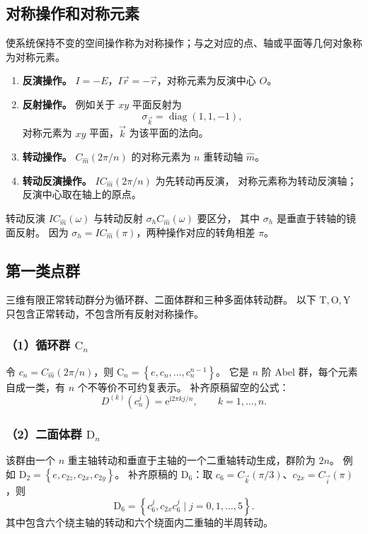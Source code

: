 \subsection{对称操作和对称元素}
使系统保持不变的空间操作称为对称操作；与之对应的点、轴或平面等几何对象称为对称元素。
\begin{enumerate}
\item \textbf{反演操作。} $I=-E$，$I\vec r=-\vec r$，对称元素为反演中心 $O$。
\item \textbf{反射操作。} 例如关于 $xy$ 平面反射为
\begin{equation}
\sigma_{\vec k}=\operatorname{diag}\left(1,1,-1\right),
\end{equation}
对称元素为 $xy$ 平面，$\vec k$ 为该平面的法向。
\item \textbf{转动操作。} $C_{\hat m}\left(2\pi/n\right)$ 的对称元素为 $n$ 重转动轴 $\hat m$。
\item \textbf{转动反演操作。} $IC_{\hat m}\left(2\pi/n\right)$ 为先转动再反演，
对称元素称为转动反演轴；反演中心取在轴上的原点。
\end{enumerate}
转动反演 $IC_{\hat m}\left(\omega\right)$ 与转动反射 $\sigma_hC_{\hat m}\left(\omega\right)$ 要区分，
其中 $\sigma_h$ 是垂直于转轴的镜面反射。
因为 $\sigma_h=IC_{\hat m}\left(\pi\right)$，两种操作对应的转角相差 $\pi$。

\subsection{第一类点群}
三维有限正常转动群分为循环群、二面体群和三种多面体转动群。
以下 $\mathrm{T},\mathrm{O},\mathrm{Y}$ 只包含正常转动，不包含所有反射对称操作。

\subsubsection*{（1）循环群 $\mathrm{C}_n$}
令 $c_n=C_{\hat m}\left(2\pi/n\right)$，则 $\mathrm{C}_n=\left\{e,c_n,\ldots,c_n^{n-1}\right\}$。
它是 $n$ 阶 Abel 群，每个元素自成一类，有 $n$ 个不等价不可约复表示。
补齐原稿留空的公式：
\begin{equation}
D^{\left(k\right)}\left(c_n^j\right)=\mathrm{e}^{\mathrm{i}2\pi kj/n},\qquad k=1,\ldots,n.
\end{equation}

\subsubsection*{（2）二面体群 $\mathrm{D}_n$}
该群由一个 $n$ 重主轴转动和垂直于主轴的一个二重轴转动生成，群阶为 $2n$。
例如 $\mathrm{D}_2=\left\{e,c_{2z},c_{2x},c_{2y}\right\}$。
补齐原稿的 $\mathrm{D}_6$：取 $c_6=C_{\vec k}\left(\pi/3\right)$、$c_{2x}=C_{\vec i}\left(\pi\right)$，则
\begin{equation}
\mathrm{D}_6=\left\{c_6^j,c_{2x}c_6^j\mid j=0,1,\ldots,5\right\}.
\end{equation}
其中包含六个绕主轴的转动和六个绕面内二重轴的半周转动。

